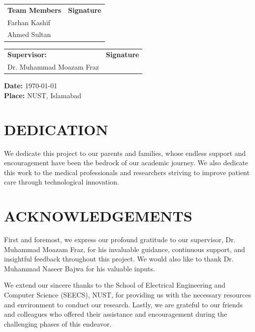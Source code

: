 \documentclass[12pt, a4paper]{report}
\begin{document}
\vspace{1in}
\noindent
\begin{tabular}{@{}p{3in} p{3in}@{}}
\textbf{Team Members} & \textbf{Signature} \\
Farhan Kashif & \hrulefill \\
Ahmed Sultan & \hrulefill \\
\end{tabular}

\vspace{1in}
\noindent
\begin{tabular}{@{}p{3in} p{3in}@{}}
\textbf{Supervisor:} & \textbf{Signature} \\
Dr. Muhammad Moazam Fraz & \hrulefill \\
\end{tabular}

\vspace{0.5in}
\noindent
\textbf{Date:} \today \\
\textbf{Place:} NUST, Islamabad

\clearpage

\chapter*{DEDICATION}
We dedicate this project to our parents and families, whose endless support and encouragement have been the bedrock of our academic journey. We also dedicate this work to the medical professionals and researchers striving to improve patient care through technological innovation.

\chapter*{ACKNOWLEDGEMENTS}
First and foremost, we express our profound gratitude to our supervisor, Dr. Muhammad Moazam Fraz, for his invaluable guidance, continuous support, and insightful feedback throughout this project. We would also like to thank Dr. Muhammad Naseer Bajwa for his valuable inputs. 

We extend our sincere thanks to the School of Electrical Engineering and Computer Science (SEECS), NUST, for providing us with the necessary resources and environment to conduct our research. Lastly, we are grateful to our friends and colleagues who offered their assistance and encouragement during the challenging phases of this endeavor.
\end{document}
